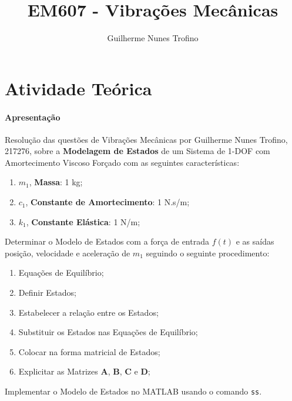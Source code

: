 \documentclass{article}
\title{EM607 - Vibrações Mecânicas}
\author{Guilherme Nunes Trofino}
\begin{document}
    \maketitle
\newpage

\section{Atividade Teórica}
\paragraph{Apresentação}Resolução das questões de Vibrações Mecânicas por Guilherme Nunes Trofino, 217276, sobre a \textbf{Modelagem de Estados} de um Sistema de 1-DOF com Amortecimento Viscoso Forçado com as seguintes características:
\begin{enumerate}
    \item $m_1$, \textbf{Massa}: 1 kg;
    \item $c_1$, \textbf{Constante de Amortecimento}: 1 N.s/m;
    \item $k_1$, \textbf{Constante Elástica}: 1 N/m;
\end{enumerate}

\newpage\begin{exercise}\label{ex1}
    Determinar o Modelo de Estados com a força de entrada $f(t)$ e as saídas posição, velocidade e aceleração de $m_1$ seguindo o seguinte procedimento:
    \begin{enumerate}
        \item Equações de Equilíbrio;
        \item Definir Estados;
        \item Estabelecer a relação entre os Estados;
        \item Substituir os Estados nas Equações de Equilíbrio;
        \item Colocar na forma matricial de Estados;
        \item Explicitar as Matrizes $\mathbf{A}$, $\mathbf{B}$, $\mathbf{C}$ e $\mathbf{D}$;
    \end{enumerate}
\end{exercise}
\begin{resolution}

\end{resolution}

\newpage\begin{exercise}\label{ex2}
    Implementar o Modelo de Estados no MATLAB usando o comando \texttt{ss}.
\end{exercise}
\begin{resolution}

\end{resolution}
\end{document}
